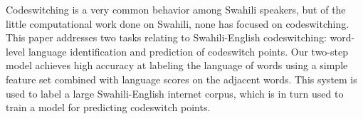 Codeswitching is a very common behavior among Swahili speakers, but of the little computational work done on Swahili, none has focused on codeswitching. This paper addresses two tasks relating to Swahili-English codeswitching: word-level language identification and prediction of codeswitch points. Our two-step model achieves high accuracy at labeling the language of words using a simple feature set combined with language scores on the adjacent words. This system is used to label a large Swahili-English internet corpus, which is in turn used to train a model for predicting codeswitch points.
